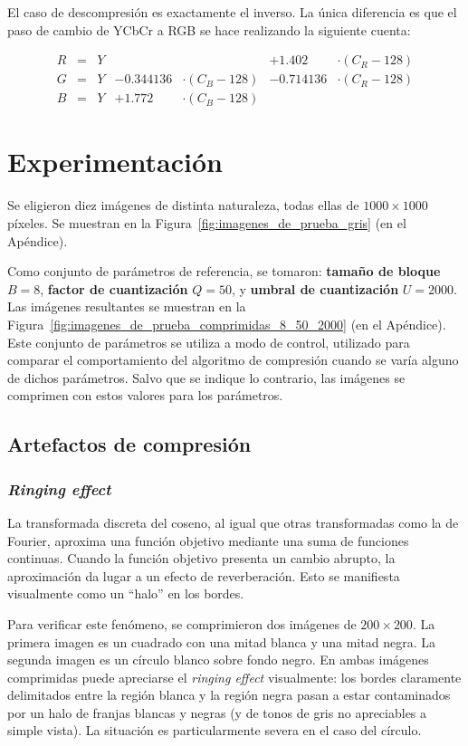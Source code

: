\documentclass{article}
\begin{document}
El caso de descompresión es exactamente el inverso. La única diferencia es que el paso de cambio de YCbCr a RGB se hace realizando la siguiente cuenta:

\begin{align}
 R &=& Y              &&& + 1.402  & \cdot (C_R-128) \\
 G &=& Y  & - 0.344136 & \cdot (C_B-128)& - 0.714136 & \cdot (C_R-128) \\
 B &=& Y  & + 1.772  & \cdot (C_B-128)&
\end{align}

\section{Experimentación}

Se eligieron diez imágenes de distinta naturaleza, todas ellas de
$1000 \times 1000$ píxeles. Se muestran en la Figura~\ref{fig:imagenes_de_prueba_gris} (en el Apéndice).

Como conjunto de parámetros de referencia, se tomaron:
{\bf tamaño de bloque} $B = 8$,
{\bf factor de cuantización} $Q = 50$,
y {\bf umbral de cuantización} $U = 2000$.
Las imágenes resultantes se muestran en
la Figura~\ref{fig:imagenes_de_prueba_comprimidas_8_50_2000}
(en el Apéndice).
Este conjunto de parámetros se utiliza a modo de control,
utilizado para comparar el comportamiento del algoritmo de compresión
cuando se varía alguno de dichos parámetros.
Salvo que se indique lo contrario, las imágenes se comprimen con
estos valores para los parámetros.

\subsection{Artefactos de compresión}

\subsubsection{{\em Ringing effect}}

La transformada discreta del coseno, al igual que otras transformadas
como la de Fourier, aproxima una función objetivo
mediante una suma de funciones continuas. 
Cuando la función objetivo presenta un cambio abrupto,
la aproximación da lugar a un efecto de
reverberación.
Esto se manifiesta visualmente como un ``halo'' en los bordes.

Para verificar este fenómeno, se comprimieron dos imágenes de
$200 \times 200$.
La primera imagen es un cuadrado con una mitad blanca y una
mitad negra.
La segunda imagen es un círculo blanco sobre fondo negro.
En ambas imágenes comprimidas puede apreciarse el {\em ringing effect}
visualmente:
los bordes claramente delimitados entre la región blanca y la
región negra pasan a estar contaminados por un halo de
franjas blancas y negras (y de tonos de gris no apreciables
a simple vista).
La situación es particularmente severa en el caso del círculo.
\end{document}
